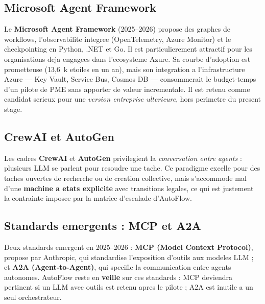 \documentclass[12pt,a4paper,openany]{report}
\begin{document}
\subsection{Microsoft Agent Framework}
Le \textbf{Microsoft Agent Framework} (2025--2026) propose des graphes de workflows, l'observabilite integree (OpenTelemetry, Azure Monitor) et le checkpointing en Python, .NET et Go. Il est particulierement attractif pour les organisations deja engagees dans l'ecosysteme Azure. Sa courbe d'adoption est prometteuse (13,6~k etoiles en un an), mais son integration a l'infrastructure Azure --- Key Vault, Service Bus, Cosmos DB --- consommerait le budget-temps d'un pilote de PME sans apporter de valeur incrementale. Il est retenu comme candidat serieux pour une \emph{version entreprise ulterieure}, hors perimetre du present stage.

\subsection{CrewAI et AutoGen}
Les cadres \textbf{CrewAI} et \textbf{AutoGen} privilegient la \emph{conversation entre agents} : plusieurs LLM se parlent pour resoudre une tache. Ce paradigme excelle pour des taches ouvertes de recherche ou de creation collective, mais s'accommode mal d'une \textbf{machine a etats explicite} avec transitions legales, ce qui est justement la contrainte imposee par la matrice d'escalade d'AutoFlow.

\subsection{Standards emergents : MCP et A2A}
Deux standards emergent en 2025--2026 : \textbf{MCP (Model Context Protocol)}, propose par Anthropic, qui standardise l'exposition d'outils aux modeles LLM ; et \textbf{A2A (Agent-to-Agent)}, qui specifie la communication entre agents autonomes. AutoFlow reste en \textbf{veille} sur ces standards : MCP deviendra pertinent si un LLM avec outils est retenu apres le pilote ; A2A est inutile a un seul orchestrateur.
\end{document}
